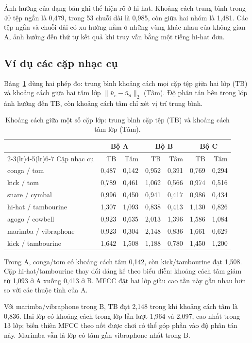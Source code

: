 \documentclass[11pt,a4paper]{article}
\begin{document}
Ảnh hưởng của dạng bản ghi thể hiện rõ ở hi-hat. Khoảng cách trung bình trong 40 tệp ngắn là 0,479, trong 53 chuỗi dài là 0,985, còn giữa hai nhóm là 1,481. Các tệp ngắn và chuỗi dài có xu hướng nằm ở những vùng khác nhau của không gian A, ảnh hưởng đến thứ tự kết quả khi truy vấn bằng một tiếng hi-hat đơn.

\subsection{Ví dụ các cặp nhạc cụ}\label{sec:cap}
Bảng~\ref{tab:cap} dùng hai phép đo: trung bình khoảng cách mọi cặp tệp giữa hai lớp (TB) và khoảng cách giữa hai tâm lớp $\|\bar u_c-\bar u_d\|_2$ (Tâm). Độ phân tán bên trong lớp ảnh hưởng đến TB, còn khoảng cách tâm chỉ xét vị trí trung bình.
\begin{table}[H]
\centering\small
\caption{Khoảng cách giữa một số cặp lớp: trung bình cặp tệp (TB) và khoảng cách tâm lớp (Tâm).}\label{tab:cap}
\begin{tabular}{lrrrrrr}
\toprule
& \multicolumn{2}{c}{Bộ A} & \multicolumn{2}{c}{Bộ B} & \multicolumn{2}{c}{Bộ C}\\
\cmidrule(lr){2-3}\cmidrule(lr){4-5}\cmidrule(lr){6-7}
Cặp nhạc cụ & TB & Tâm & TB & Tâm & TB & Tâm\\\midrule
conga / tom & 0,487 & 0,142 & 0,952 & 0,391 & 0,769 & 0,294 \\
kick / tom & 0,789 & 0,461 & 1,062 & 0,566 & 0,974 & 0,516 \\
snare / cymbal & 0,996 & 0,450 & 0,941 & 0,417 & 0,986 & 0,434 \\
hi-hat / tambourine & 1,307 & 1,093 & 0,838 & 0,413 & 1,130 & 0,826 \\
agogo / cowbell & 0,923 & 0,635 & 2,013 & 1,396 & 1,586 & 1,084 \\
marimba / vibraphone & 0,923 & 0,304 & 2,148 & 0,836 & 1,661 & 0,629 \\
kick / tambourine & 1,642 & 1,508 & 1,188 & 0,780 & 1,450 & 1,200 \\
\bottomrule
\end{tabular}
\end{table}
Trong A, conga/tom có khoảng cách tâm 0,142, còn kick/tambourine đạt 1,508. Cặp hi-hat/tambourine thay đổi đáng kể theo biểu diễn: khoảng cách tâm giảm từ 1,093 ở A xuống 0,413 ở B. MFCC đặt hai lớp giàu cao tần này gần nhau hơn so với các thuộc tính của A.

Với marimba/vibraphone trong B, TB đạt 2,148 trong khi khoảng cách tâm là 0,836. Hai lớp có khoảng cách trong lớp lần lượt 1,964 và 2,097, cao nhất trong 13 lớp; biến thiên MFCC theo nốt được chơi có thể góp phần vào độ phân tán này. Marimba vẫn là lớp có tâm gần vibraphone nhất trong B.
\end{document}
